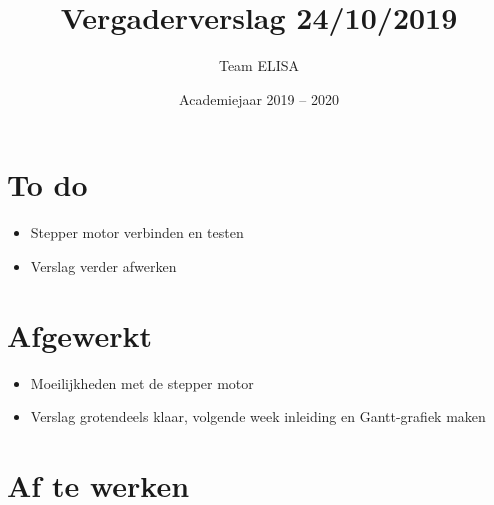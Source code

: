 \documentclass[a4paper,kulak]{kulakarticle} %
\date{Academiejaar 2019 -- 2020}
\title{Vergaderverslag 24/10/2019}
\author{Team ELISA}
\begin{document}
	
	\maketitle
	
	\section*{To do}
	
	\begin{itemize}
		\item Stepper motor verbinden en testen
		\item Verslag verder afwerken
		
	\end{itemize}
	
	\section*{Afgewerkt}
	\begin{itemize}
		\item Moeilijkheden met de stepper motor
		\item Verslag grotendeels klaar, volgende week inleiding en Gantt-grafiek maken
	\end{itemize}
	
	\section*{Af te werken}
	
	
\end{document}
